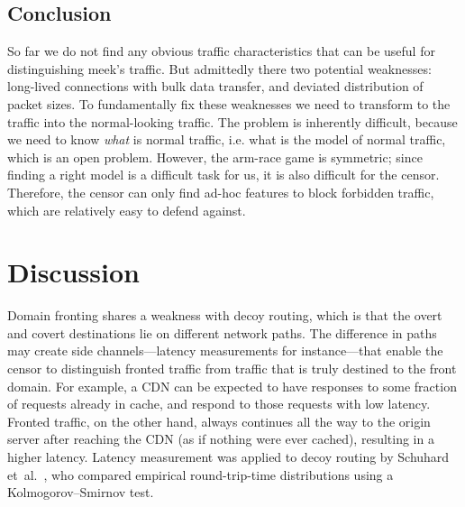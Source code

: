 \documentclass[conference]{IEEEtran}
\def\meek{meek}
\begin{document}
\subsection{Conclusion} So far we do not find any obvious traffic characteristics that can be useful for
distinguishing \meek's traffic. But admittedly there two potential weaknesses: long-lived connections 
with bulk data transfer, and deviated distribution of packet sizes. To fundamentally fix these weaknesses 
we need to transform to the traffic into the normal-looking traffic. The problem is inherently difficult, because we need to know \emph{what} is normal traffic, i.e. what is the model of normal traffic, which is an open problem. However, 
the arm-race game is symmetric; since finding a right model is a difficult task for us, it is also difficult for 
the censor. Therefore, the censor can only find ad-hoc features to block forbidden traffic, which are relatively 
easy to defend against. 

\section{Discussion}
\label{sec:discussion}


Domain fronting shares a weakness with decoy routing,
which is that the overt and covert destinations lie on different
network paths.
The difference in paths may create side channels---latency measurements for instance---that
enable the censor to
distinguish fronted traffic from traffic that is truly destined
to the front domain.
For example, a CDN can be expected to have responses
to some fraction of requests already in cache,
and respond to those requests with low latency.
Fronted traffic, on the other hand, always continues all the way
to the origin server after reaching the CDN (as if nothing were ever cached),
resulting in a higher latency.
Latency measurement was applied to decoy routing by Schuhard et~al.~\cite[Section~5]{ccs2012-decoys},
who compared empirical round-trip-time distributions using a
Kolmogorov--Smirnov test.
\end{document}
